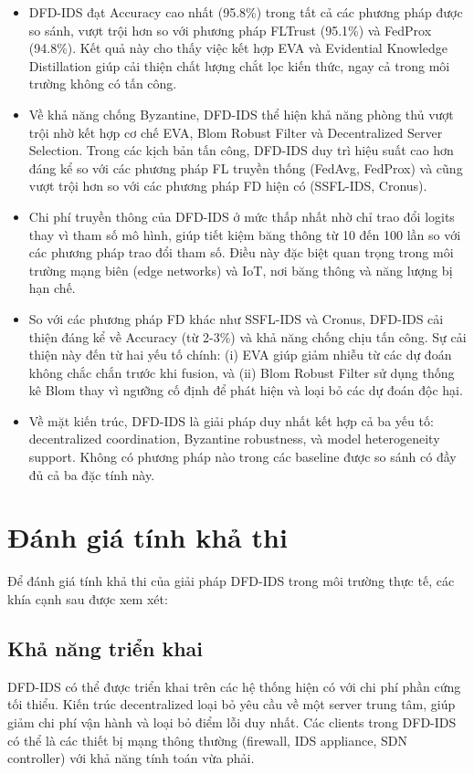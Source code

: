 \begin{itemize}
    \item DFD-IDS đạt Accuracy cao nhất (95.8\%) trong tất cả các phương pháp được so sánh, vượt trội hơn so với phương pháp FLTrust (95.1\%) và FedProx (94.8\%). Kết quả này cho thấy việc kết hợp EVA và Evidential Knowledge Distillation giúp cải thiện chất lượng chắt lọc kiến thức, ngay cả trong môi trường không có tấn công.
    \item Về khả năng chống Byzantine, DFD-IDS thể hiện khả năng phòng thủ vượt trội nhờ kết hợp cơ chế EVA, Blom Robust Filter và Decentralized Server Selection. Trong các kịch bản tấn công, DFD-IDS duy trì hiệu suất cao hơn đáng kể so với các phương pháp FL truyền thống (FedAvg, FedProx) và cũng vượt trội hơn so với các phương pháp FD hiện có (SSFL-IDS, Cronus).
    \item Chi phí truyền thông của DFD-IDS ở mức thấp nhất nhờ chỉ trao đổi logits thay vì tham số mô hình, giúp tiết kiệm băng thông từ 10 đến 100 lần so với các phương pháp trao đổi tham số. Điều này đặc biệt quan trọng trong môi trường mạng biên (edge networks) và IoT, nơi băng thông và năng lượng bị hạn chế.
    \item So với các phương pháp FD khác như SSFL-IDS và Cronus, DFD-IDS cải thiện đáng kể về Accuracy (từ 2-3\%) và khả năng chống chịu tấn công. Sự cải thiện này đến từ hai yếu tố chính: (i) EVA giúp giảm nhiễu từ các dự đoán không chắc chắn trước khi fusion, và (ii) Blom Robust Filter sử dụng thống kê Blom thay vì ngưỡng cố định để phát hiện và loại bỏ các dự đoán độc hại.
    \item Về mặt kiến trúc, DFD-IDS là giải pháp duy nhất kết hợp cả ba yếu tố: decentralized coordination, Byzantine robustness, và model heterogeneity support. Không có phương pháp nào trong các baseline được so sánh có đầy đủ cả ba đặc tính này.
\end{itemize}

\section{Đánh giá tính khả thi}
\label{sec:feasibility}

Để đánh giá tính khả thi của giải pháp DFD-IDS trong môi trường thực tế, các khía cạnh sau được xem xét:

\subsection{Khả năng triển khai}
DFD-IDS có thể được triển khai trên các hệ thống hiện có với chi phí phần cứng tối thiểu. Kiến trúc decentralized loại bỏ yêu cầu về một server trung tâm, giúp giảm chi phí vận hành và loại bỏ điểm lỗi duy nhất. Các clients trong DFD-IDS có thể là các thiết bị mạng thông thường (firewall, IDS appliance, SDN controller) với khả năng tính toán vừa phải.

